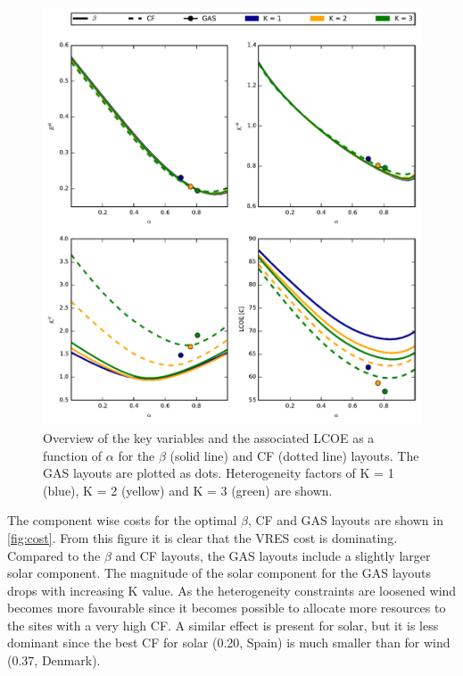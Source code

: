 \documentclass[a4paper, 5p, sort&compress]{elsarticle}%
\begin{document}
\begin{figure}[p]
  \centering
  \includegraphics[width = 2 \columnwidth]{dataSync}
  \caption{Overview of the key variables and the associated LCOE as a
    function of $\alpha$ for the $\beta$ (solid line) and CF (dotted
    line) layouts. The GAS layouts are plotted as dots. Heterogeneity
    factors of K = 1 (blue), K = 2 (yellow) and K = 3 (green) are
    shown.}
  \label{fig:overview}
\end{figure}

The component wise costs for the optimal $\beta$, CF and GAS layouts are
shown in \cref{fig:cost}. From this figure it is clear that the VRES
cost is dominating. Compared to the $\beta$ and CF layouts, the GAS
layouts include a slightly larger solar component. The magnitude of
the solar component for the GAS layouts drops with increasing K
value. As the heterogeneity constraints are loosened wind becomes more
favourable since it becomes possible to allocate more resources to the
sites with a very high CF. A similar effect is present for solar, but
it is less dominant since the best CF for solar (0.20, Spain) is much
smaller than for wind (0.37, Denmark).
\end{document}
